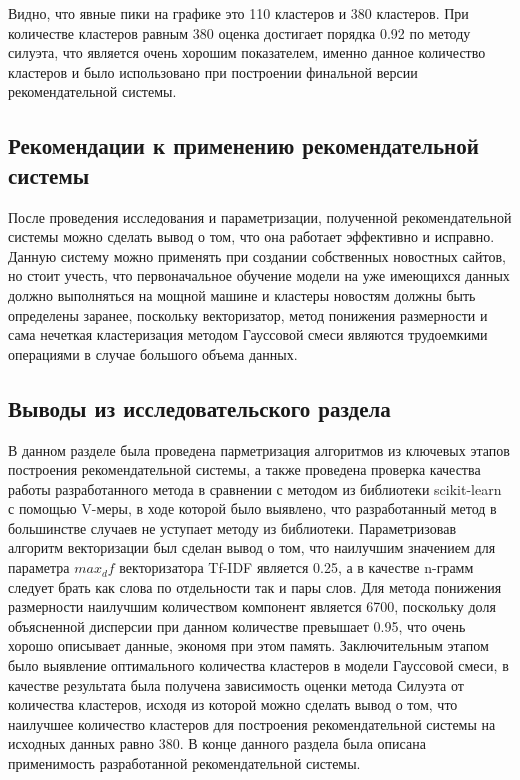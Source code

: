 Видно, что явные пики на графике это 110 кластеров и 380 кластеров. При количестве кластеров равным 380 оценка достигает порядка 0.92 по методу силуэта, что является очень хорошим показателем, именно данное количество кластеров и было использовано при построении финальной версии рекомендательной системы.

\subsection{Рекомендации к применению рекомендательной системы}

После проведения исследования и параметризации, полученной рекомендательной системы можно сделать вывод о том, что она работает эффективно и исправно. Данную систему можно применять при создании собственных новостных сайтов, но стоит учесть, что первоначальное обучение модели на уже имеющихся данных должно выполняться на мощной машине и кластеры новостям должны быть определены заранее, поскольку векторизатор, метод понижения размерности и сама нечеткая кластеризация методом Гауссовой смеси являются трудоемкими операциями в случае большого объема данных.

\subsection{Выводы из исследовательского раздела}

В данном разделе была проведена парметризация алгоритмов из ключевых этапов построения рекомендательной системы, а также проведена проверка качества работы разработанного метода в сравнении с методом из библиотеки scikit-learn с помощью V-меры, в ходе которой было выявлено, что разработанный метод в большинстве случаев не уступает методу из библиотеки. Параметризовав алгоритм векторизации был сделан вывод о том, что наилучшим значением для параметра $max_df$ векторизатора Tf-IDF является 0.25, а в качестве n-грамм следует брать как слова по отдельности так и пары слов. Для метода понижения размерности наилучшим количеством компонент является 6700, поскольку доля объясненной дисперсии при данном количестве превышает 0.95, что очень хорошо описывает данные, экономя при этом память. Заключительным этапом было выявление оптимального количества кластеров в модели Гауссовой смеси, в качестве результата была получена зависимость оценки метода Силуэта от количества кластеров, исходя из которой можно сделать вывод о том, что наилучшее количество кластеров для построения рекомендательной системы на исходных данных равно 380. В конце данного раздела была описана применимость разработанной рекомендательной системы.

\pagebreak
